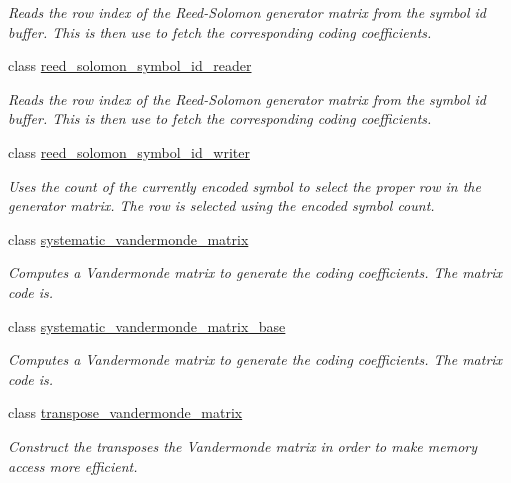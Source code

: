 \begin{DoxyCompactItemize}
\begin{DoxyCompactList}\small\item\em Reads the row index of the Reed-\/\-Solomon generator matrix from the symbol id buffer. This is then use to fetch the corresponding coding coefficients. \end{DoxyCompactList}\item 
class \hyperlink{classkodo_1_1reed__solomon__symbol__id__reader}{reed\-\_\-solomon\-\_\-symbol\-\_\-id\-\_\-reader}
\begin{DoxyCompactList}\small\item\em Reads the row index of the Reed-\/\-Solomon generator matrix from the symbol id buffer. This is then use to fetch the corresponding coding coefficients. \end{DoxyCompactList}\item 
class \hyperlink{classkodo_1_1reed__solomon__symbol__id__writer}{reed\-\_\-solomon\-\_\-symbol\-\_\-id\-\_\-writer}
\begin{DoxyCompactList}\small\item\em Uses the count of the currently encoded symbol to select the proper row in the generator matrix. The row is selected using the encoded symbol count. \end{DoxyCompactList}\item 
class \hyperlink{classkodo_1_1systematic__vandermonde__matrix}{systematic\-\_\-vandermonde\-\_\-matrix}
\begin{DoxyCompactList}\small\item\em Computes a Vandermonde matrix to generate the coding coefficients. The matrix code is. \end{DoxyCompactList}\item 
class \hyperlink{classkodo_1_1systematic__vandermonde__matrix__base}{systematic\-\_\-vandermonde\-\_\-matrix\-\_\-base}
\begin{DoxyCompactList}\small\item\em Computes a Vandermonde matrix to generate the coding coefficients. The matrix code is. \end{DoxyCompactList}\item 
class \hyperlink{classkodo_1_1transpose__vandermonde__matrix}{transpose\-\_\-vandermonde\-\_\-matrix}
\begin{DoxyCompactList}\small\item\em Construct the transposes the Vandermonde matrix in order to make memory access more efficient. \end{DoxyCompactList}\item 

\end{DoxyCompactItemize}
